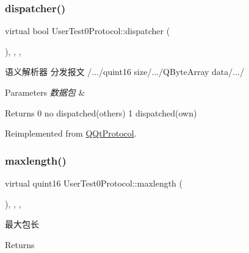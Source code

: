 \subsubsection{\texorpdfstring{dispatcher()}{dispatcher()}}
{\footnotesize\ttfamily virtual bool User\+Test0\+Protocol\+::dispatcher (\begin{DoxyParamCaption}\item[{const Q\+Byte\+Array \&}]{ }\end{DoxyParamCaption})\hspace{0.3cm}{\ttfamily [inline]}, {\ttfamily [override]}, {\ttfamily [protected]}, {\ttfamily [virtual]}}



语义解析器 分发报文 /.../quint16 size/.../\+Q\+Byte\+Array data/.../ 


\begin{DoxyParams}{Parameters}
{\em 数据包} & \\
\hline
\end{DoxyParams}
\begin{DoxyReturn}{Returns}
0 no dispatched(others) 1 dispatched(own) 
\end{DoxyReturn}


Reimplemented from \mbox{\hyperlink{class_q_qt_protocol_a35a69c4b89c8cf7459038f40d75e0dc9}{Q\+Qt\+Protocol}}.

\mbox{\label{class_user_test0_protocol_a29ba76e4eef2b17fbfac01534fc660a2}} 
\subsubsection{\texorpdfstring{maxlength()}{maxlength()}}
{\footnotesize\ttfamily virtual quint16 User\+Test0\+Protocol\+::maxlength (\begin{DoxyParamCaption}{ }\end{DoxyParamCaption})\hspace{0.3cm}{\ttfamily [inline]}, {\ttfamily [override]}, {\ttfamily [protected]}, {\ttfamily [virtual]}}



最大包长 

\begin{DoxyReturn}{Returns}

\end{DoxyReturn}


